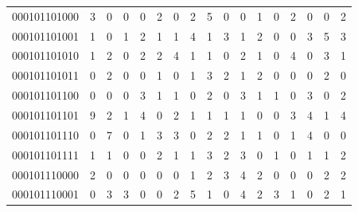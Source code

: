 \documentclass[10pt,a4paper]{article}
\begin{document}
\begin{longtable}{ |c|c|c|c|c|c|c|c|c|c|c|c|c|c|c|c|c| }
    000101101000              & 3                            & 0                                & 0                            & 0                              & 2   & 0   & 2   & 5   & 0   & 0   & 1   & 0   & 2   & 0   & 0   & 2   \\
    000101101001              & 1                            & 0                                & 1                            & 2                              & 1   & 1   & 4   & 1   & 3   & 1   & 2   & 0   & 0   & 3   & 5   & 3   \\
    000101101010              & 1                            & 2                                & 0                            & 2                              & 2   & 4   & 1   & 1   & 0   & 2   & 1   & 0   & 4   & 0   & 3   & 1   \\
    000101101011              & 0                            & 2                                & 0                            & 0                              & 1   & 0   & 1   & 3   & 2   & 1   & 2   & 0   & 0   & 0   & 2   & 0   \\
    000101101100              & 0                            & 0                                & 0                            & 3                              & 1   & 1   & 0   & 2   & 0   & 3   & 1   & 1   & 0   & 3   & 0   & 2   \\
    000101101101              & 9                            & 2                                & 1                            & 4                              & 0   & 2   & 1   & 1   & 1   & 1   & 0   & 0   & 3   & 4   & 1   & 4   \\
    000101101110              & 0                            & 7                                & 0                            & 1                              & 3   & 3   & 0   & 2   & 2   & 1   & 1   & 0   & 1   & 4   & 0   & 0   \\
    000101101111              & 1                            & 1                                & 0                            & 0                              & 2   & 1   & 1   & 3   & 2   & 3   & 0   & 1   & 0   & 1   & 1   & 2   \\
    000101110000              & 2                            & 0                                & 0                            & 0                              & 0   & 0   & 1   & 2   & 3   & 4   & 2   & 0   & 0   & 0   & 2   & 2   \\
    000101110001              & 0                            & 3                                & 3                            & 0                              & 0   & 2   & 5   & 1   & 0   & 4   & 2   & 3   & 1   & 0   & 2   & 1   \\

\end{longtable}
\end{document}
